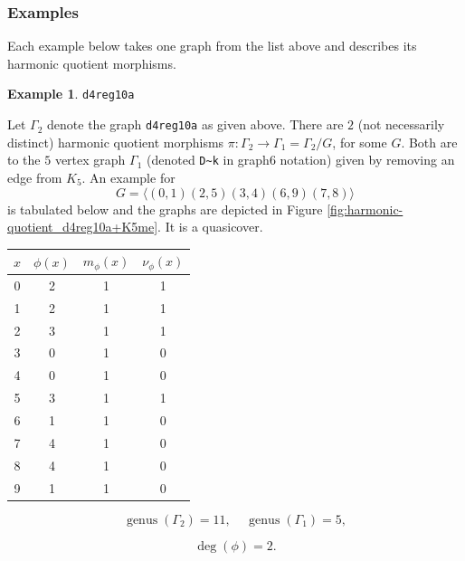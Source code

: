 \documentclass[12pt,letterpaper]{article}
\theoremstyle{definition}
\newtheorem{example}[theorem]{Example}
\DeclareMathOperator{\genus}{genus}
\begin{document}
\subsubsection{Examples}

Each example below takes one graph from the list above and describes
its harmonic quotient morphisms.




\begin{example}%
\label{example:d4reg10a}
 {\tt d4reg10a}\newline
{\rm  
  Let $\Gamma_2$ denote the graph {\tt d4reg10a} as given above.
There are $2$ (not necessarily distinct) harmonic quotient morphisms
$\pi: \Gamma_2\to \Gamma_1=\Gamma_2/G$,
for some $G$. Both are to the $5$ vertex graph $\Gamma_1$
(denoted \verb+D~k+ in graph6 notation)
given by removing an edge from $K_5$.
An example for
\[
G = \langle (0,1)(2,5)(3,4)(6,9)(7,8) \rangle
\]
is tabulated below and the graphs are depicted in
Figure \ref{fig:harmonic-quotient_d4reg10a+K5me}.
It is a quasicover.

\begin{center}
\begin{tabular}{c|c|c|c}  
  $x$ & $\phi(x)$ & $m_\phi(x)$ & $\nu_\phi(x)$ \\ \hline
  0   &    2   &        1         &  1   \\ 
  1   &    2   &        1         &  1  \\ 
  2   &    3   &        1         &  1  \\ 
  3   &    0   &        1         &  0  \\ 
  4   &    0   &        1         &  0   \\
  5   &    3   &        1         &  1   \\
  6   &    1   &        1         &  0   \\
  7   &    4   &        1         &  0   \\
  8   &    4   &        1         &  0   \\
  9   &    1   &        1         &  0   \\     
\end{tabular}
\end{center}

\[
  \genus(\Gamma_2) =11,\ \ \ \ \
  \genus(\Gamma_1) =5,
\]

\[
\deg(\phi) =2.
\]

}
\end{example}
\end{document}
